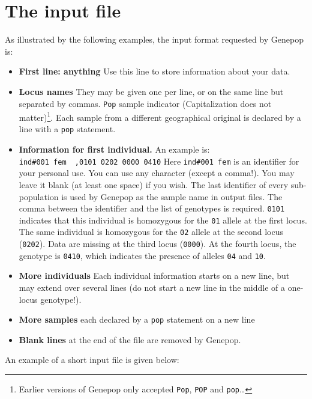 \documentclass[12pt,]{book}
\providecommand{\tightlist}{%
  \setlength{\itemsep}{0pt}\setlength{\parskip}{0pt}}
\let\rmarkdownfootnote\footnote%
\def\footnote{\protect\rmarkdownfootnote}
\begin{document}
\chapter{The input file}\label{the-input-file}

 As illustrated by the following examples, the input
format requested by Genepop is:

\begin{itemize}
\tightlist
\item
  \textbf{First line: anything} Use this line to store information about
  your data.
\item
  \textbf{Locus names} They may be given one per line, or on the same
  line but separated by commas. \texttt{Pop} sample indicator
  (Capitalization does not matter)\footnote{Earlier versions of Genepop
    only accepted \texttt{Pop}, \texttt{POP} and \texttt{pop}\ldots{}}.
  Each sample from a different geographical original is declared by a
  line with a \texttt{pop} statement.
\item
  \textbf{Information for first individual.} An example is:
  \texttt{ind\#001\ fem\ \ ,0101\ 0202\ 0000\ 0410} Here
  \texttt{ind\#001\ fem} is an identifier for your personal use. You can
  use any character (except a comma!). You may leave it blank (at least
  one space) if you wish. The last identifier of every sub-population is
  used by Genepop as the sample name in output files. The comma between
  the identifier and the list of genotypes is required. \texttt{0101}
  indicates that this individual is homozygous for the \texttt{01}
  allele at the first locus. The same individual is homozygous for the
  \texttt{02} allele at the second locus (\texttt{0202}). Data are
  missing at the third locus (\texttt{0000}). At the fourth locus, the
  genotype is \texttt{0410}, which indicates the presence of alleles
  \texttt{04} and \texttt{10}.
\item
  \textbf{More individuals} Each individual information starts on a new
  line, but may extend over several lines (do not start a new line in
  the middle of a one-locus genotype!).
\item
  \textbf{More samples} each declared by a \texttt{pop} statement on a
  new line
\item
  \textbf{Blank lines} at the end of the file are removed by Genepop.
\end{itemize}

An example of a short input file is given below:
\end{document}
